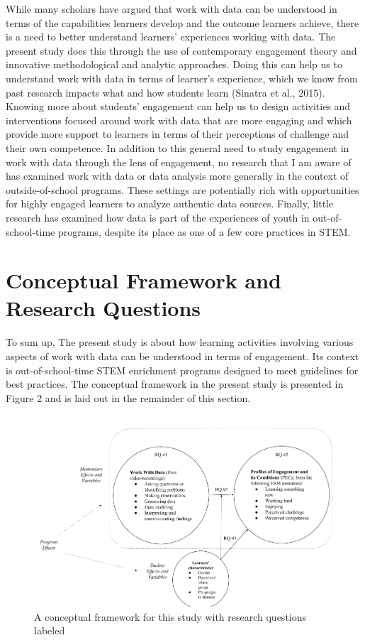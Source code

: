 \documentclass[]{msu-thesis}
\theoremstyle{definition}
\theoremstyle{definition}
\theoremstyle{definition}
\theoremstyle{remark}
\begin{document}
While many scholars have argued that work with data can be understood in
terms of the capabilities learners develop and the outcome learners
achieve, there is a need to better understand learners' experiences
working with data. The present study does this through the use of
contemporary engagement theory and innovative methodological and
analytic approaches. Doing this can help us to understand work with data
in terms of learner's experience, which we know from past research
impacts what and how students learn (Sinatra et al., 2015). Knowing more
about students' engagement can help us to design activities and
interventions focused around work with data that are more engaging and
which provide more support to learners in terms of their perceptions of
challenge and their own competence. In addition to this general need to
study engagement in work with data through the lens of engagement, no
research that I am aware of has examined work with data or data analysis
more generally in the context of outside-of-school programs. These
settings are potentially rich with opportunities for highly engaged
learners to analyze authentic data sources. Finally, little research has
examined how data is part of the experiences of youth in
out-of-school-time programs, despite its place as one of a few core
practices in STEM.

\section{Conceptual Framework and Research
Questions}\label{conceptual-framework-and-research-questions}

To sum up, The present study is about how learning activities involving
various aspects of work with data can be understood in terms of
engagement. Its context is out-of-school-time STEM enrichment programs
designed to meet guidelines for best practices. The conceptual framework
in the present study is presented in Figure 2 and is laid out in the
remainder of this section.

\begin{figure}

{\centering \includegraphics[width=0.8\linewidth]{images/figure2} 

}

\caption{A conceptual framework for this study with research questions labeled}\label{fig:unnamed-chunk-2}
\end{figure}
\end{document}
